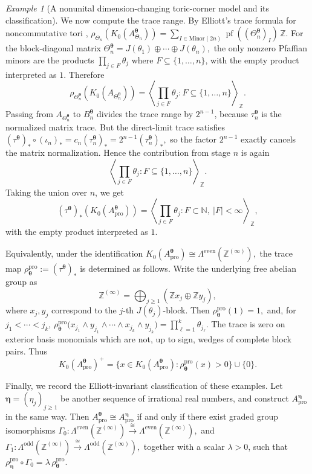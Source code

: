 \documentclass[11pt]{amsart}
\theoremstyle{definition}
\theoremstyle{remark}
\newtheorem{example}[theorem]{Example}
\newcommand{\Z}{\mathbb{Z}}
\newcommand{\N}{\mathbb N}
\newcommand{\ex}{\mathrm{pro}}
\begin{document}
\begin{example}[A nonunital dimension-changing toric-corner model and its classification]
We now compute the trace range. By Elliott's trace formula for
noncommutative tori
\cite[\S1.3, Theorems~2.2 and~3.1]{Ell84},
$\rho_{\Theta_n}(K_0(A_{\Theta_n}^{\boldsymbol\theta}))
=\sum_{I\in \mathrm{Minor}(2n)}\operatorname{pf}((\Theta_n^{\boldsymbol\theta})_I)\,\Z.$
For the block-diagonal matrix $\Theta_n^{\boldsymbol\theta}
=J(\theta_1)\oplus\cdots\oplus J(\theta_n),$ the only nonzero Pfaffian minors are the products
$\prod_{j\in F}\theta_j$ where $F\subseteq\{1,\ldots,n\}$,
with the empty product interpreted as \(1\). 
Therefore
\[
\rho_{\Theta_n^{\boldsymbol\theta}}
(K_0(A_{\Theta_n^{\boldsymbol\theta}}))
=
\left\langle
\prod_{j\in F}\theta_j:
F\subseteq\{1,\ldots,n\}
\right\rangle_{\Z}.
\]
Passing from $A_{\Theta_n^{\boldsymbol\theta}}$ to
$B_n^{\boldsymbol\theta}$ divides the trace range by $2^{n-1}$, because
$\tau_n^{\boldsymbol\theta}$ is the normalized matrix trace. But the
direct-limit trace satisfies $(\tau^{\boldsymbol\theta})_*\circ(\iota_n)_*=c_n(\tau_n^{\boldsymbol\theta})_*
=2^{n-1}(\tau_n^{\boldsymbol\theta})_*,$
so the factor $2^{n-1}$ exactly cancels the matrix normalization. Hence the
contribution from stage \(n\) is again
\[
\left\langle
\prod_{j\in F}\theta_j:
F\subseteq\{1,\ldots,n\}
\right\rangle_{\Z}.
\]
Taking the union over $n$, we get
\[
(\tau^{\boldsymbol\theta})_*
(K_0(A_{\ex}^{\boldsymbol\theta}))
=
\left\langle
\prod_{j\in F}\theta_j:
F\subset \N,\ |F|<\infty
\right\rangle_{\Z},
\]
with the empty product interpreted as  $1$.

Equivalently, under the identification $K_0(A_{\ex}^{\boldsymbol\theta})\cong\Lambda^{\mathrm{even}}(\Z^{(\infty)}),$
the trace map $\rho_{\boldsymbol\theta}^{\ex}:=(\tau^{\boldsymbol\theta})_*$
is determined as follows. Write the underlying free abelian group as
\[
\Z^{(\infty)}
=
\bigoplus_{j\geq1}(\Z x_j\oplus \Z y_j),
\]
where $x_j,y_j$ correspond to the $j$-th $J(\theta_j)$-block. Then $\rho_{\boldsymbol\theta}^{\ex}(1)=1,$
and, for $j_1<\cdots<j_k$, $\rho_{\boldsymbol\theta}^{\ex}
\bigl(
x_{j_1}\wedge y_{j_1}\wedge\cdots\wedge
x_{j_k}\wedge y_{j_k}
\bigr)
=
\prod_{\ell=1}^k\theta_{j_\ell}.$
The trace is zero on exterior basis monomials which are not, up to sign, wedges
of complete block pairs. Thus
\[
K_0(A_{\ex}^{\boldsymbol\theta})^+
=
\{x\in K_0(A_{\ex}^{\boldsymbol\theta}):
\rho_{\boldsymbol\theta}^{\ex}(x)>0\}\cup\{0\}.
\]

Finally, we record the Elliott-invariant classification of these examples. Let $\boldsymbol\eta=(\eta_j)_{j\geq1}$
be another sequence of irrational real numbers, and construct
$A_{\ex}^{\boldsymbol\eta}$ in the same way. Then $A_{\ex}^{\boldsymbol\theta}\cong A_{\ex}^{\boldsymbol\eta}$
if and only if there exist graded group isomorphisms
$\Gamma_0\colon
\Lambda^{\mathrm{even}}(\Z^{(\infty)})
\xrightarrow{\cong}
\Lambda^{\mathrm{even}}(\Z^{(\infty)}),$
and $\Gamma_1\colon
\Lambda^{\mathrm{odd}}(\Z^{(\infty)})
\xrightarrow{\cong}
\Lambda^{\mathrm{odd}}(\Z^{(\infty)}),$
together with a scalar $\lambda>0$, such that $\rho_{\boldsymbol\eta}^{\ex}\circ\Gamma_0=\lambda\,\rho_{\boldsymbol\theta}^{\ex}.$


\end{example}
\end{document}
